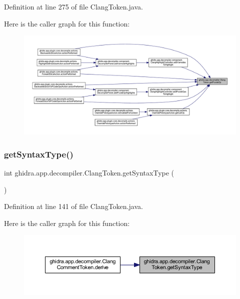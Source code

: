 Definition at line 275 of file Clang\+Token.\+java.

Here is the caller graph for this function\+:
\nopagebreak
\begin{figure}[H]
\begin{center}
\leavevmode
\includegraphics[width=350pt]{classghidra_1_1app_1_1decompiler_1_1_clang_token_a96d9143747ec664bf622560d80367455_icgraph}
\end{center}
\end{figure}
\mbox{\label{classghidra_1_1app_1_1decompiler_1_1_clang_token_abc4ee81e384e94cf8ef1bcb566b3498d}} 
\subsubsection{\texorpdfstring{getSyntaxType()}{getSyntaxType()}}
{\footnotesize\ttfamily int ghidra.\+app.\+decompiler.\+Clang\+Token.\+get\+Syntax\+Type (\begin{DoxyParamCaption}{ }\end{DoxyParamCaption})\hspace{0.3cm}{\ttfamily [inline]}}



Definition at line 141 of file Clang\+Token.\+java.

Here is the caller graph for this function\+:
\nopagebreak
\begin{figure}[H]
\begin{center}
\leavevmode
\includegraphics[width=350pt]{classghidra_1_1app_1_1decompiler_1_1_clang_token_abc4ee81e384e94cf8ef1bcb566b3498d_icgraph}
\end{center}
\end{figure}
\mbox{\label{classghidra_1_1app_1_1decompiler_1_1_clang_token_a416468e5684d3f35aad5c82ce9ee3943}} 
